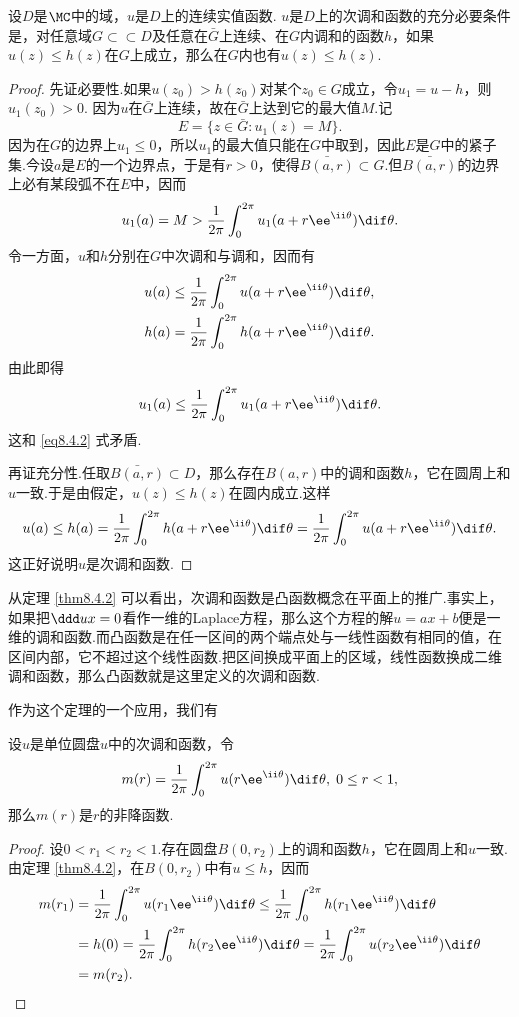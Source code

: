 \begin{theorem}\label{thm8.4.2}
设$D$是$\MC$中的域，$u$是$D$上的连续实值函数. $u$是$D$上的次调和函数的充分必要条件是，对任意域$G\subset\subset D$及任意在$\bar G$上连续、在$G$内调和的函数$h$，如果$u(z)\le h(z)$在$G$上成立，那么在$G$内也有$u(z)\le h(z)$.
\end{theorem}
\begin{proof}
先证必要性.如果$u(z_0)>h(z_0)$对某个$z_0\in G$成立，令$u_1=u-h$，则$u_1(z_0)>0$. 因为$u$在$\bar G$上连续，故在$\bar G$上达到它的最大值$M$.记
\[E=\{z\in\bar G:u_1(z)=M\}.\]
因为在$G$的边界上$u_1\le0$，所以$u_1$的最大值只能在$G$中取到，因此$E$是$G$中的紧子集.今设$a$是$E$的一个边界点，于是有$r>0$，使得$\bar{B(a,r)}\subset G$.但$\bar{B(a,r)}$的边界上必有某段弧不在$E$中，因而
\begin{equation}\label{eq8.4.2}
u_1(a)=M>\frac1{2\pi}\int_0^{2\pi}u_1(a+r\ee^{\ii\theta})\dif \theta.
\end{equation}
令一方面，$u$和$h$分别在$G$中次调和与调和，因而有
\begin{align*}
&u(a)\le\frac1{2\pi}\int_0^{2\pi}u(a+r\ee^{\ii\theta})\dif \theta,\\
&h(a)=\frac1{2\pi}\int_0^{2\pi}h(a+r\ee^{\ii\theta})\dif \theta.
\end{align*}
由此即得
\[u_1(a)\le\frac1{2\pi}\int_0^{2\pi}u_1(a+r\ee^{\ii\theta})\dif \theta.\]
这和 \eqref{eq8.4.2} 式矛盾.

再证充分性.任取$\bar{B(a,r)}\subset D$，那么存在$B(a,r)$中的调和函数$h$，它在圆周上和$u$一致.于是由假定，$u(z)\le h(z)$在圆内成立.这样
\[u(a)\le h(a)=\frac1{2\pi}\int_0^{2\pi}h(a+r\ee^{\ii\theta})\dif \theta
=\frac1{2\pi}\int_0^{2\pi}u(a+r\ee^{\ii\theta})\dif \theta.\]
这正好说明$u$是次调和函数.
\end{proof}

从定理 \ref{thm8.4.2} 可以看出，次调和函数是凸函数概念在平面上的推广.事实上，如果把$\ddd ux=0$看作一维的Laplace方程，那么这个方程的解$u=ax+b$便是一维的调和函数.而凸函数是在任一区间的两个端点处与一线性函数有相同的值，在区间内部，它不超过这个线性函数.把区间换成平面上的区域，线性函数换成二维调和函数，那么凸函数就是这里定义的次调和函数.

作为这个定理的一个应用，我们有
\begin{theorem}\label{thm8.4.3}
设$u$是单位圆盘$u$中的次调和函数，令
\[m(r)=\frac1{2\pi}\int_0^{2\pi}u(r\ee^{\ii\theta})\dif \theta,\;0\le r<1,\]
那么$m(r)$是$r$的非降函数.
\end{theorem}
\begin{proof}
设$0<r_1<r_2<1$.存在圆盘$B(0,r_2)$上的调和函数$h$，它在圆周上和$u$一致.由定理 \ref{thm8.4.2}，在$B(0,r_2)$中有$u\le h$，因而
\begin{align*}
  m(r_1) & = \frac1{2\pi}\int_0^{2\pi}u(r_1\ee^{\ii\theta})\dif \theta
  \le \frac1{2\pi}\int_0^{2\pi} h(r_1\ee^{\ii\theta})
  \dif \theta\\
  &  = h(0) = \frac1{2\pi}\int_0^{2\pi}h(r_2\ee^{\ii\theta})
  \dif \theta
  = \frac1{2\pi}\int_0^{2\pi}u(r_2\ee^{\ii\theta})\dif \theta\\
  & = m(r_2). \qedhere
\end{align*}
\end{proof}

